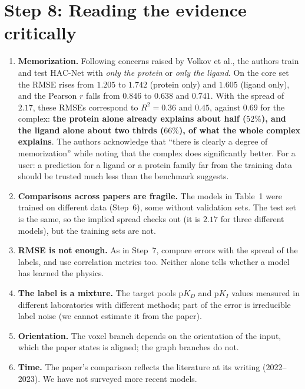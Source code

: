 \documentclass[11pt]{article}
\newcommand{\pK}{\mathrm{p}K}
\begin{document}
\section{Step 8: Reading the evidence critically}
\begin{enumerate}[nosep]
  \item \textbf{Memorization.} Following concerns raised by Volkov et al., the authors train and test HAC-Net with \emph{only the protein} or \emph{only the ligand}. On the core set the RMSE rises from $1.205$ to $1.742$ (protein only) and $1.605$ (ligand only), and the Pearson $r$ falls from $0.846$ to $0.638$ and $0.741$. With the spread of $2.17$, these RMSEs correspond to $R^2=0.36$ and $0.45$, against $0.69$ for the complex: \textbf{the protein alone already explains about half ($52\%$), and the ligand alone about two thirds ($66\%$), of what the whole complex explains}. The authors acknowledge that ``there is clearly a degree of memorization'' while noting that the complex does significantly better. For a user: a prediction for a ligand or a protein family far from the training data should be trusted much less than the benchmark suggests.
  \item \textbf{Comparisons across papers are fragile.} The models in Table~1 were trained on different data (Step~6), some without validation sets. The test set is the same, so the implied spread checks out (it is $2.17$ for three different models), but the training sets are not.
  \item \textbf{RMSE is not enough.} As in Step~7, compare errors with the spread of the labels, and use correlation metrics too. Neither alone tells whether a model has learned the physics.
  \item \textbf{The label is a mixture.} The target pools $\pK_D$ and $\pK_I$ values measured in different laboratories with different methods; part of the error is irreducible label noise (we cannot estimate it from the paper).
  \item \textbf{Orientation.} The voxel branch depends on the orientation of the input, which the paper states is aligned; the graph branches do not.
  \item \textbf{Time.} The paper's comparison reflects the literature at its writing (2022--2023). We have not surveyed more recent models.
\end{enumerate}

\end{document}

